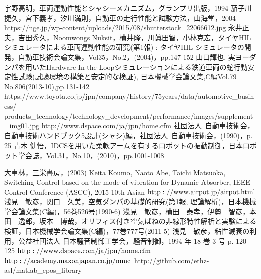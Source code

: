 \documentclass[a4paper,12pt]{article_vdlab_sotsuron}
\begin{document}
\newpage
\begin{thebibliography}{99}
宇野高明，車両運動性能とシャシーメカニズム，グランプリ出版，1994
茄子川捷久，宮下義孝，汐川満則，自動車の走行性能と試験方法，山海堂，2004
https://nge.jp/wp-content/uploads/2015/08/shutterstock\_22066612.jpg
永井正夫，吉田秀久，Noomwongs Nuksit，横井隆，川眞田智，小林克宏，タイヤHIL シミュレータによる車両運動性能の研究(第1報) : タイヤHIL シミュレータの開発，自動車技術会論文集，Vol35，No.2，(2004)，pp.147-152
山口輝也, 実ヨーダンパを用いたHardware-In-the-Loopシミュレーションによる鉄道車両の蛇行動安定性試験(試験環境の構築と安定的な検証), 日本機械学会論文集,C編Vol.79 No.806(2013-10),pp.131-142
https://www.toyota.co.jp/jpn/company/history/75years/data/automotive\_business/ \\ products\_technology/technology\_development/performance/images/supplement\_img01.jpg
http://www.dspace.com/ja/jpn/home.cfm
社団法人\ 自動車技術会，自動車技術ハンドブック5設計(シャシ)編，社団法人\ 自動車技術会，(1990)，p. 25
青木 健悟，IDCSを用いた柔軟アームを有するロボットの振動制御，日本ロボット学会誌，Vol.31，No.10，(2010)，pp.1001-1008


大車林，三栄書房，(2003)
Keita Koumo, Naoto Abe, Taichi Matsuoka, Switching Control based on the mode of vibration for Dynamic Absorber, IEEE Control Conference (ASCC), 2015 10th Asian
$\rm{http://www.airpot.jp/airpot.html}$
浅見　敏彦，関口　久美，空気ダンパの基礎的研究(第1報, 理論解析)，日本機械学会論文集(C編)，56巻526号(1990-6)
浅見　敏彦，横田　泰孝，伊勢　智彦，本田　逸郎，坂本　博哉，オリフィス付き空気ばねの非線形特性解析と実験による検証，日本機械学会論文集(C編)，77巻777号(2011-5)
浅見　敏彦，粘性減衰の利用，公益社団法人 日本騒音制御工学会，騒音制御，1994 年 18 巻 3 号 p. 120-125
$\rm{http://www.dspace.com/ja/jpn/home.cfm}$
$\rm{http://academy.maxonjapan.co.jp/mmc}$
http://github.com/ethz-asl/matlab\_epos\_library
\end{thebibliography}
\end{document}
